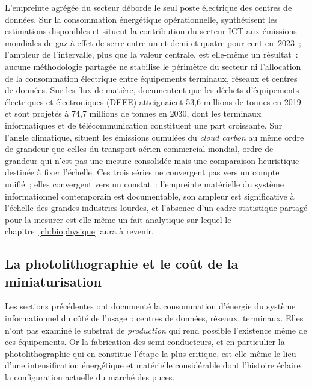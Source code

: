 %
L'empreinte agrégée du secteur déborde le seul poste électrique des centres de données. Sur la consommation énergétique opérationnelle, \textcite{bieser_review_2023} synthétisent les estimations disponibles et situent la contribution du secteur ICT aux émissions mondiales de gaz à effet de serre entre un et demi et quatre pour cent en~2023~; l'ampleur de l'intervalle, plus que la valeur centrale, est elle-même un résultat~: aucune méthodologie partagée ne stabilise le périmètre du secteur ni l'allocation de la consommation électrique entre équipements terminaux, réseaux et centres de données. Sur les flux de matière, \textcite{forti_global_2020} documentent que les déchets d'équipements électriques et électroniques (DEEE) atteignaient 53,6 millions de tonnes en 2019 et sont projetés à 74,7 millions de tonnes en 2030, dont les terminaux informatiques et de télécommunication constituent une part croissante. Sur l'angle climatique, \textcite{mazzucato_ai_2024} situent les émissions cumulées du \emph{cloud carbon} au même ordre de grandeur que celles du transport aérien commercial mondial, ordre de grandeur qui n'est pas une mesure consolidée mais une comparaison heuristique destinée à fixer l'échelle. Ces trois séries ne convergent pas vers un compte unifié~; elles convergent vers un constat~: l'empreinte matérielle du système informationnel contemporain est documentable, son ampleur est significative à l'échelle des grandes industries lourdes, et l'absence d'un cadre statistique partagé pour la mesurer est elle-même un fait analytique sur lequel le chapitre~\ref{ch:biophysique} aura à revenir.


\subsection{La photolithographie et le coût de la miniaturisation}\label{subsec:lithographie}

%
Les sections précédentes ont documenté la consommation d'énergie du système informationnel du côté de l'usage~: centres de données, réseaux, terminaux. Elles n'ont pas examiné le substrat de \emph{production} qui rend possible l'existence même de ces équipements. Or la fabrication des semi-conducteurs, et en particulier la photolithographie qui en constitue l'étape la plus critique, est elle-même le lieu d'une intensification énergétique et matérielle considérable dont l'histoire éclaire la configuration actuelle du marché des puces.

